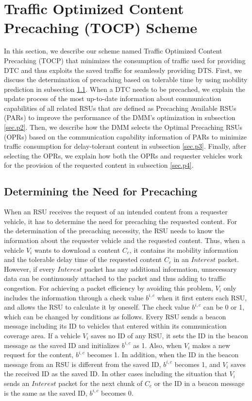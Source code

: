 \documentclass{ieeeaccess}
\begin{document}
\section{Traffic Optimized Content Precaching (TOCP) Scheme} \label{sec.prop}
In this section, we describe our scheme named Traffic Optimized Content Precaching (TOCP) that minimizes the consumption of traffic used for providing DTC and thus exploits the saved traffic for seamlessly providing DTS.
First, we discuss the determination of precaching based on tolerable time by using mobility prediction in subsection \ref{sec.p1}.
When a DTC needs to be precached, we explain the update process of the most up-to-date information about communication capabilities of all related RSUs that are defined as Precaching Available RSUs (PARs) to improve the performance of the DMM's optimization in subsection \ref{sec.p2}.
Then, we describe how the DMM selects the Optimal Precaching RSUs (OPRs) based on the communication capability information of PARs to minimize traffic consumption for delay-tolerant content in subsection \ref{sec.p3}.
Finally, after selecting the OPRs, we explain how both the OPRs and requester vehicles work for the provision of the requested content in subsection \ref{sec.p4}.

\subsection{Determining the Need for Precaching} \label{sec.p1}
When an RSU receives the request of an intended content from a requester vehicle, it has to determine the need for precaching the requested content. For the determination of the precaching necessity, the RSU needs to know the information about the requester vehicle and the requested content.
Thus, when a vehicle $V_{i}$ wants to download a content $C_{c}$, it contains its mobility information and the tolerable delay time of the requested content $C_{c}$ in an $Interest$ packet.
However, if every $Interest$ packet has any additional information, unnecessary data can be continuously attached to the packet and thus adding to traffic congestion.
For achieving a packet efficiency by avoiding this problem, $V_{i}$ only includes the information through a check value $b^{i,c}$ when it first enters each RSU, and allows the RSU to calculate it by oneself.
The check value $b^{i,c}$ can be 0 or 1, which can be changed by conditions as follows.
Every RSU sends a beacon message including its ID to vehicles that entered within its communication coverage area.
If a vehicle $V_{i}$ saves no ID of any RSU, it sets the ID in the beacon message as the saved ID and initializes $b^{i,c}$ as 1.
Also, when $V_{i}$ makes a new request for the content, $b^{i,c}$ becomes 1.
In addition, when the ID in the beacon message from an RSU is different from the saved ID, $b^{i,c}$ becomes 1, and $V_{i}$ saves the received ID as the saved ID.
In other cases including the situation that $V_{i}$ sends an $Interest$ packet for the next chunk of $C_{c}$ or the ID in a beacon message is the same as the saved ID, $b^{i,c}$ becomes 0.
\end{document}
